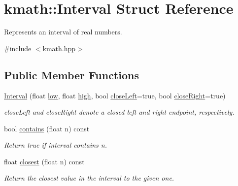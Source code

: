 \hypertarget{structkmath_1_1_interval}{\section{kmath\-:\-:Interval Struct Reference}
\label{structkmath_1_1_interval}
}


Represents an interval of real numbers.  




{\ttfamily \#include $<$kmath.\-hpp$>$}

\subsection*{Public Member Functions}
\begin{DoxyCompactItemize}
\item 
\hyperlink{structkmath_1_1_interval_aab7a5d1a1c25ccf8ca32796dc3230fbd}{Interval} (float \hyperlink{structkmath_1_1_interval_ad575587eae91b8bce8f5ab4578f96d2b}{low}, float \hyperlink{structkmath_1_1_interval_ab89c246d6c21a786d5f09f837ff6d104}{high}, bool \hyperlink{structkmath_1_1_interval_a8301dbeccf9a042992eeb8bc4873fe83}{close\-Left}=true, bool \hyperlink{structkmath_1_1_interval_aa4962a6e38a17ff02321589ba9a4f990}{close\-Right}=true)
\begin{DoxyCompactList}\small\item\em {\ttfamily close\-Left} and {\ttfamily close\-Right} denote a closed left and right endpoint, respectively. \end{DoxyCompactList}\item 
bool \hyperlink{structkmath_1_1_interval_af196d10186744c7f3adc855e7343bb1e}{contains} (float n) const 
\begin{DoxyCompactList}\small\item\em Return true if interval contains {\ttfamily n}. \end{DoxyCompactList}\item 
float \hyperlink{structkmath_1_1_interval_af6b38235f08105530f09dbdc2a4cb10c}{closest} (float n) const 
\begin{DoxyCompactList}\small\item\em Return the closest value in the interval to the given one. \end{DoxyCompactList}\end{DoxyCompactItemize}
